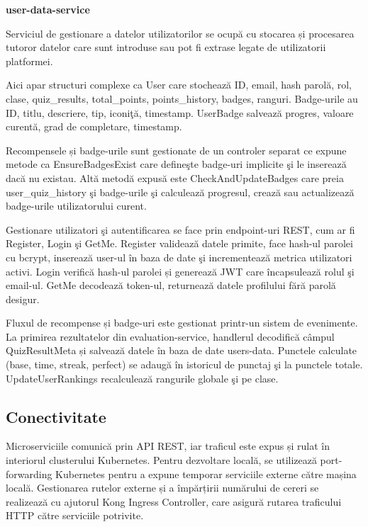 \textbf{user-data-service}

Serviciul de gestionare a datelor utilizatorilor se ocupă cu stocarea și 
procesarea tutoror datelor care sunt introduse sau pot fi extrase legate
de utilizatorii platformei.

Aici apar structuri complexe ca User care stochează ID, email, hash parolă, rol, clase,  
quiz\_results, total\_points, points\_history, badges, ranguri.  
Badge-urile au ID, titlu, descriere, tip, iconiţă, timestamp.  
UserBadge salvează progres, valoare curentă, grad de completare, timestamp.  

Recompensele și badge-urile sunt gestionate de un controler separat ce 
expune metode ca 
EnsureBadgesExist care defineşte badge-uri implicite şi le inserează  
dacă nu existau. Altă metodă expusă este CheckAndUpdateBadges care preia 
user\_quiz\_history şi badge-urile şi calculează progresul, crează sau actualizează
badge-urile utilizatorului curent.  

Gestionare utilizatori şi autentificarea se face prin endpoint-uri REST,
cum ar fi Register, Login şi GetMe.  
Register validează datele primite, face hash-ul parolei cu bcrypt, inserează user-ul în baza de date  
şi incrementează metrica utilizatori activi.  
Login verifică hash-ul parolei și generează JWT care încapsulează rolul şi email-ul.  
GetMe decodează token-ul, returnează datele profilului fără parolă desigur.  

Fluxul de recompense și badge-uri este gestionat printr-un sistem de evenimente.
La primirea rezultatelor din evaluation-service, handlerul decodifică câmpul
QuizResultMeta și salvează datele în baza de date users-data.  
Punctele calculate (base, time, streak, perfect) se adaugă  
în istoricul de punctaj şi la punctele totale.  
UpdateUserRankings recalculează rangurile globale şi pe clase.  

\subsection{Conectivitate}
\label{subsec:implementare-backend}

Microserviciile comunică prin API REST, iar traficul este expus și rulat în interiorul clusterului Kubernetes.
Pentru dezvoltare locală, se utilizează port-forwarding Kubernetes pentru a expune temporar serviciile
externe către mașina locală. Gestionarea rutelor externe și a împărțirii numărului de cereri se realizează 
cu ajutorul Kong Ingress Controller, care asigură rutarea traficului HTTP către serviciile potrivite.

